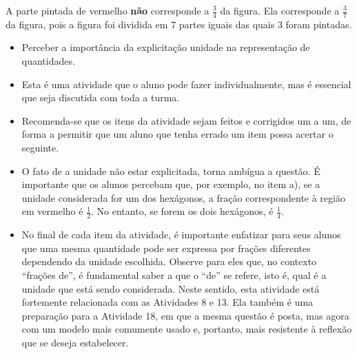 \begin{multicols}{2}
\begin{orientacoes}
\end{orientacoes}


\begin{solucao}{}{}
  A parte pintada de vermelho   {\bf não}   corresponde a   $\frac{3}{4}$ da figura. Ela corresponde a $\frac{3}{7}$ da figura, pois a figura foi dividida em   $7$ partes iguais das quais $3$ foram pintadas.
\end{solucao}

\begin{objetivos}[label=chap2-ativ18]{}{}
\begin{itemize} %
    \item       Perceber a importância da explicitação unidade na representação de quantidades.
\end{itemize} %
\end{objetivos}

\begin{orientacoes}
\begin{itemize} %
    \item       Esta é uma atividade que o aluno pode fazer individualmente, mas é essencial que seja discutida com toda a turma.
    \item       Recomenda-se que os itens da atividade sejam feitos e corrigidos um a um, de forma a permitir que um aluno que tenha errado um item possa acertar o seguinte.
    \item       O fato de a unidade não estar explicitada, torna ambígua a questão. É importante que os alunos percebam que, por exemplo, no item a), se a unidade considerada for um dos hexágonos, a fração correspondente à região em vermelho é $\frac{1}{2}$. No entanto, se forem os dois hexágonos, é $\frac{1}{4}$.
    \item       No final de cada item da atividade, é importante enfatizar para seus alunos que uma mesma quantidade pode ser expressa por frações diferentes dependendo da unidade escolhida. Observe para eles que, no contexto       ``frações de'', é fundamental saber a que o       ``de''     se refere, isto é, qual é a unidade que está sendo considerada. Neste sentido, esta atividade está fortemente relacionada com as Atividades 8 e 13. Ela também é uma preparação para a Atividade 18, em que a mesma questão é posta, mas agora com um modelo mais comumente usado e, portanto, mais resistente à reflexão que se deseja estabelecer.
\end{itemize} %
\end{orientacoes}


\end{multicols}
